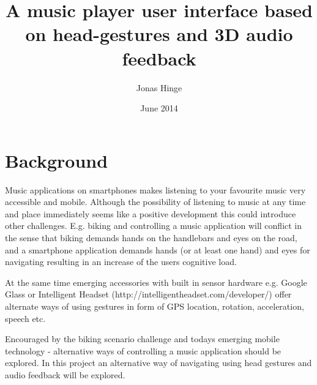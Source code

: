 \documentclass{article}
\title{A music player user interface based on head-gestures and 3D audio feedback}
\author{Jonas Hinge}
\date{June 2014}
\begin{document}
\maketitle

\section{Background}
Music applications on smartphones makes listening to your favourite music very accessible and mobile. Although the possibility of listening to music at any time and place immediately seems like a positive development this could introduce other challenges. E.g. biking and controlling a music application will conflict in the sense that biking demands hands on the handlebars and eyes on the road, and a smartphone application demands hands (or at least one hand) and eyes for navigating resulting in an increase of the users cognitive load.

At the same time emerging accessories with built in sensor hardware e.g. Google Glass or Intelligent Headset (http://intelligentheadset.com/developer/) offer alternate ways of using gestures in form of GPS location, rotation, acceleration, speech etc.

Encouraged by the biking scenario challenge and todays emerging mobile technology - alternative ways of controlling a music application should be explored. In this project an alternative way of navigating using head gestures and audio feedback will be explored.

\begin{comment}
PROJECT FORMULATION FROM COURSE BASE

Smartphone interfaces often require use of the hands and eyes in form of gesture navigating through menus and application user interfaces. In some everyday scenarios however it is challenging to navigate the smartphone in this traditional way e.g. when biking as this requires steering and eyes on the road. Emerging accessories with built in sensor hardware e.g. Google Glass or Intelligent Headset (http://intelligentheadset.com/developer/) offer alternate ways of using gestures and getting feedback when interacting with the music player. In this project it will be investigated how and to which degree the use of head gestures in combination with spatial audio feedback could be used to navigate and control through a music library. 

More specifically the following questions should be answered: 
- Can a user interface based on head gestures and 3d audio compete with existing user interfaces for music players (e.g. touch and vision-based) with respect to for instance a) navigation and control efficiency b) learnability, c) general usability (cognitive/perceptive load), c) suitability to real-world hands-occupied situations. 

- With the chosen combination of input and output modalities, there is a high risk for the system to misinterpret normal everyday actions performed by the user as commands for controlling the system ("behavioural cluttering" (Janlert et al., in press)). How can features in the user interface prevent unwanted manipulation of the system?
\end{comment}
\end{document}
